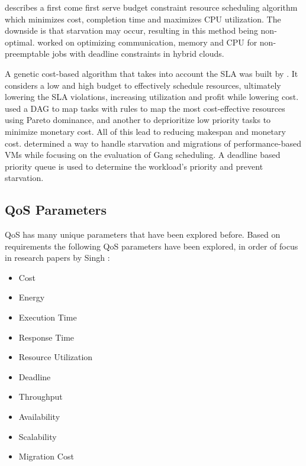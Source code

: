\documentclass[fullapage,12pt]{article}
\begin{document}
\textcite{ana2010} describes a first come first serve budget constraint resource scheduling algorithm which minimizes cost, completion time and maximizes CPU utilization. The downside is that starvation may occur, resulting in this  method being non-optimal.
\textcite{van2010cost} worked on optimizing communication, memory and CPU for non-preemptable jobs with deadline constraints in hybrid clouds.

A genetic cost-based algorithm that takes into account the SLA was built by \textcite{liu2013cost}. It considers a low and high budget to effectively schedule resources, ultimately lowering the SLA violations, increasing utilization and profit while lowering cost.
\textcite{su2013cost} used a DAG to map tasks with rules to map the most cost-effective resources using Pareto dominance, and another to deprioritize low priority tasks to minimize monetary cost. All of this lead to reducing makespan and monetary cost.
\textcite{ioannis2011cost} determined a way to handle starvation and migrations of performance-based VMs while focusing on the evaluation of Gang scheduling. A deadline based priority queue is used to determine the workload's priority and prevent starvation.



\subsection{QoS Parameters} \label{sub:schedQosParams}

QoS has many unique parameters that have been explored before. Based on requirements the following QoS parameters have been explored, in order of focus in research papers by Singh \cite{Singh2016}:
\begin{itemize}
    \item Cost
    \item Energy
    \item Execution Time
    \item Response Time
    \item Resource Utilization
    \item Deadline
    \item Throughput
    \item Availability
    \item Scalability
    \item Migration Cost
\end{itemize}
\end{document}
